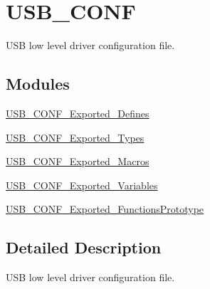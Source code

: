 \hypertarget{group___u_s_b___c_o_n_f}{\section{U\-S\-B\-\_\-\-C\-O\-N\-F}
\label{group___u_s_b___c_o_n_f}
}


U\-S\-B low level driver configuration file.  


\subsection*{Modules}
\begin{DoxyCompactItemize}
\item 
\hyperlink{group___u_s_b___c_o_n_f___exported___defines}{U\-S\-B\-\_\-\-C\-O\-N\-F\-\_\-\-Exported\-\_\-\-Defines}
\item 
\hyperlink{group___u_s_b___c_o_n_f___exported___types}{U\-S\-B\-\_\-\-C\-O\-N\-F\-\_\-\-Exported\-\_\-\-Types}
\item 
\hyperlink{group___u_s_b___c_o_n_f___exported___macros}{U\-S\-B\-\_\-\-C\-O\-N\-F\-\_\-\-Exported\-\_\-\-Macros}
\item 
\hyperlink{group___u_s_b___c_o_n_f___exported___variables}{U\-S\-B\-\_\-\-C\-O\-N\-F\-\_\-\-Exported\-\_\-\-Variables}
\item 
\hyperlink{group___u_s_b___c_o_n_f___exported___functions_prototype}{U\-S\-B\-\_\-\-C\-O\-N\-F\-\_\-\-Exported\-\_\-\-Functions\-Prototype}
\end{DoxyCompactItemize}


\subsection{Detailed Description}
U\-S\-B low level driver configuration file. 